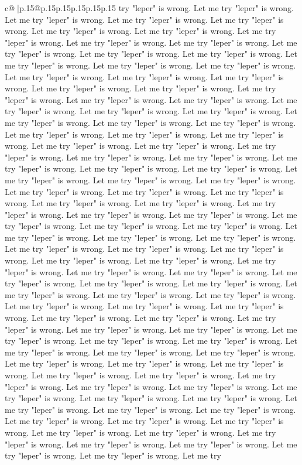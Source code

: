 \documentclass{article}
\begin{document}
{\begin{supertabular}{c@{$\;$}|p{.15\linewidth}@{}p{.15\linewidth}p{.15\linewidth}p{.15\linewidth}p{.15\linewidth}p{.15\linewidth}}
{{{try "leper" is wrong. Let me try "leper" is wrong. Let me try "leper" is wrong. Let me try "leper" is wrong. Let me try "leper" is wrong. Let me try "leper" is wrong. Let me try "leper" is wrong. Let me try "leper" is wrong. Let me try "leper" is wrong. Let me try "leper" is wrong. Let me try "leper" is wrong. Let me try "leper" is wrong. Let me try "leper" is wrong. Let me try "leper" is wrong. Let me try "leper" is wrong. Let me try "leper" is wrong. Let me try "leper" is wrong. Let me try "leper" is wrong. Let me try "leper" is wrong. Let me try "leper" is wrong. Let me try "leper" is wrong. Let me try "leper" is wrong. Let me try "leper" is wrong. Let me try "leper" is wrong. Let me try "leper" is wrong. Let me try "leper" is wrong. Let me try "leper" is wrong. Let me try "leper" is wrong. Let me try "leper" is wrong. Let me try "leper" is wrong. Let me try "leper" is wrong. Let me try "leper" is wrong. Let me try "leper" is wrong. Let me try "leper" is wrong. Let me try "leper" is wrong. Let me try "leper" is wrong. Let me try "leper" is wrong. Let me try "leper" is wrong. Let me try "leper" is wrong. Let me try "leper" is wrong. Let me try "leper" is wrong. Let me try "leper" is wrong. Let me try "leper" is wrong. Let me try "leper" is wrong. Let me try "leper" is wrong. Let me try "leper" is wrong. Let me try "leper" is wrong. Let me try "leper" is wrong. Let me try "leper" is wrong. Let me try "leper" is wrong. Let me try "leper" is wrong. Let me try "leper" is wrong. Let me try "leper" is wrong. Let me try "leper" is wrong. Let me try "leper" is wrong. Let me try "leper" is wrong. Let me try "leper" is wrong. Let me try "leper" is wrong. Let me try "leper" is wrong. Let me try "leper" is wrong. Let me try "leper" is wrong. Let me try "leper" is wrong. Let me try "leper" is wrong. Let me try "leper" is wrong. Let me try "leper" is wrong. Let me try "leper" is wrong. Let me try "leper" is wrong. Let me try "leper" is wrong. Let me try "leper" is wrong. Let me try "leper" is wrong. Let me try "leper" is wrong. Let me try "leper" is wrong. Let me try "leper" is wrong. Let me try "leper" is wrong. Let me try "leper" is wrong. Let me try "leper" is wrong. Let me try "leper" is wrong. Let me try "leper" is wrong. Let me try "leper" is wrong. Let me try "leper" is wrong. Let me try "leper" is wrong. Let me try "leper" is wrong. Let me try "leper" is wrong. Let me try "leper" is wrong. Let me try "leper" is wrong. Let me try "leper" is wrong. Let me try "leper" is wrong. Let me try "leper" is wrong. Let me try "leper" is wrong. Let me try "leper" is wrong. Let me try "leper" is wrong. Let me try "leper" is wrong. Let me try "leper" is wrong. Let me try "leper" is wrong. Let me try "leper" is wrong. Let me try "leper" is wrong. Let me try "leper" is wrong. Let me try "leper" is wrong. Let me try "leper" is wrong. Let me try "leper" is wrong. Let me try "leper" is wrong. Let me try "leper" is wrong. Let me try "leper" is wrong. Let me try "leper" is wrong. Let me try "leper" is wrong. Let me try "leper" is wrong. Let me try "leper" is wrong. Let me try "leper" is wrong. Let me try "leper" is wrong. Let me try "leper" is wrong. Let me try }}}
\end{supertabular}}
\end{document}
